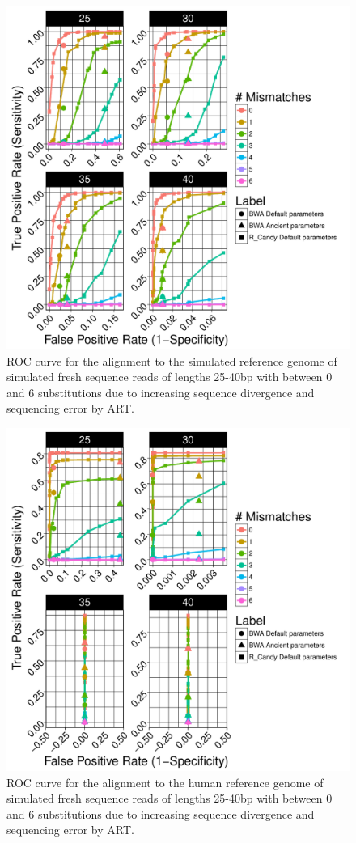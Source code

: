 \documentclass[11pt,a4paper]{report}
\begin{document}
\begin{figure}[H]
\centering
\includegraphics[width=12cm]{pictures/bROC_DS3_ART.pdf}
\caption{
ROC curve for the alignment to the simulated reference genome of simulated fresh 
sequence reads of lengths 25-40bp with between 0 and 6 substitutions due 
to increasing sequence divergence and sequencing error by ART.}
\label{DS3_ART}
\end{figure}



\begin{figure}[H]
\centering
\includegraphics[width=12cm]{pictures/bROC_DS6_ART.pdf}
\caption{
ROC curve for the alignment to the human reference genome of simulated fresh 
sequence reads of lengths 25-40bp with between 0 and 6 substitutions due 
to increasing sequence divergence and sequencing error by ART.
}
\label{DS6_ART}
\end{figure}
\end{document}
